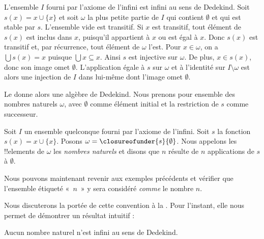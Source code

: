 \documentclass[../../../include/open-logic-section]{subfiles}
\begin{document}
L'ensemble $I$ fourni par l'axiome de l'infini est infini au sens de
Dedekind. Soit $s(x)=x\cup\{x\}$ et soit $\omega$ la plus petite partie
de $I$ qui contient $\emptyset$ et qui est stable par $s$.
L'ensemble vide est transitif. Si $x$ est transitif, tout élément de
$s(x)$ est inclus dans $x$, puisqu'il appartient à $x$ ou est égal à
$x$. Donc $s(x)$ est transitif et, par récurrence, tout élément de
$\omega$ l'est. Pour $x\in\omega$, on a $\bigcup s(x)=x$ puisque
$\bigcup x\subseteq x$. Ainsi $s$ est injective sur $\omega$. De plus,
$x\in s(x)$, donc son image omet $\emptyset$.
L'application égale à $s$ sur $\omega$ et à l'identité sur
$I\setminus\omega$ est alors une injection de $I$ dans lui-même dont
l'image omet $\emptyset$.

Le  donne alors une algèbre de Dedekind.
Nous prenons pour ensemble des nombres naturels $\omega$, avec
$\emptyset$ comme élément initial et la restriction de $s$ comme
successeur.
\begin{defn}
Soit $I$ un ensemble quelconque fourni par l'axiome de l'infini. Soit
$s$ la fonction $s(x) = x \cup \{x\}$. Posons $\omega =
\closureofunder{s}{\emptyset}$. Nous appelons les !!{element}s de
$\omega$ les \emph{nombres naturels} et disons que $n$ résulte de
$n$ applications de $s$ à $\emptyset$.
\end{defn}

Nous pouvons maintenant revenir aux exemples précédents et vérifier
que l'ensemble étiqueté «~$n$~» y sera considéré \emph{comme} le
nombre $n$.

Nous discuterons la portée de cette convention à la
. Pour l'instant, elle nous permet de
démontrer un résultat intuitif :

\begin{prop}
Aucun nombre naturel n'est infini au sens de Dedekind.
\end{prop}
\end{document}

